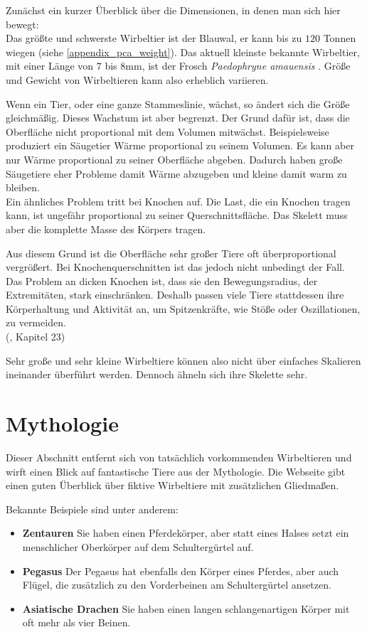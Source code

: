 Zunächst ein kurzer Überblick über die Dimensionen, in denen man sich hier bewegt:\\
Das größte und schwerste Wirbeltier ist der Blauwal, er kann bis zu $120$ Tonnen wiegen (siehe \ref{appendix_pca_weight}). Das aktuell kleinste bekannte Wirbeltier, mit einer Länge von $7$ bis $8$mm, ist der Frosch \emph{Paedophryne amauensis} \cite{smallestVertebrate}. Größe und Gewicht von Wirbeltieren kann also erheblich variieren.

Wenn ein Tier, oder eine ganze Stammeslinie, wächst, so ändert sich die Größe gleichmäßig. Dieses Wachstum ist aber begrenzt. Der Grund dafür ist, dass die Oberfläche nicht proportional mit dem Volumen mitwächst. Beispielsweise produziert ein Säugetier Wärme proportional zu seinem Volumen. Es kann aber nur Wärme proportional zu seiner Oberfläche abgeben. Dadurch haben große Säugetiere eher Probleme damit Wärme abzugeben und kleine damit warm zu bleiben. \\
Ein ähnliches Problem tritt bei Knochen auf. Die Last, die ein Knochen tragen kann, ist ungefähr proportional zu seiner Querschnittsfläche. Das Skelett muss aber die komplette Masse des Körpers tragen.

Aus diesem Grund ist die Oberfläche sehr großer Tiere oft überproportional vergrößert. Bei Knochenquerschnitten ist das jedoch nicht unbedingt der Fall. Das Problem an dicken Knochen ist, dass sie den Bewegungsradius, \zb der Extremitäten, stark einschränken. Deshalb passen viele Tiere stattdessen ihre Körperhaltung und Aktivität an, um Spitzenkräfte, wie Stöße oder Oszillationen, zu vermeiden.\\ (\cite{Vergleichende_Anatomie}, Kapitel 23)

Sehr große und sehr kleine Wirbeltiere können also nicht über einfaches Skalieren ineinander überführt werden. Dennoch ähneln sich ihre Skelette sehr.


\section{Mythologie}
\label{biology_mythology}

Dieser Abschnitt entfernt sich von tatsächlich vorkommenden Wirbeltieren und wirft einen Blick auf fantastische Tiere aus der Mythologie. Die Webseite \cite{vertebrateExtraLimbs} gibt einen guten Überblick über fiktive Wirbeltiere mit zusätzlichen Gliedmaßen. 

Bekannte Beispiele sind unter anderem:
\begin{itemize}
 \item \textbf{Zentauren} Sie haben einen Pferdekörper, aber statt eines Halses setzt ein menschlicher Oberkörper auf dem Schultergürtel auf. \cite{centaurs}
 
 \item \textbf{Pegasus} Der Pegasus hat ebenfalls den Körper eines Pferdes, aber auch Flügel, die zusätzlich zu den Vorderbeinen am Schultergürtel ansetzen. \cite{pegasus}
 
 \item \textbf{Asiatische Drachen} Sie haben einen langen schlangenartigen Körper mit oft mehr als vier Beinen.
\end{itemize}

